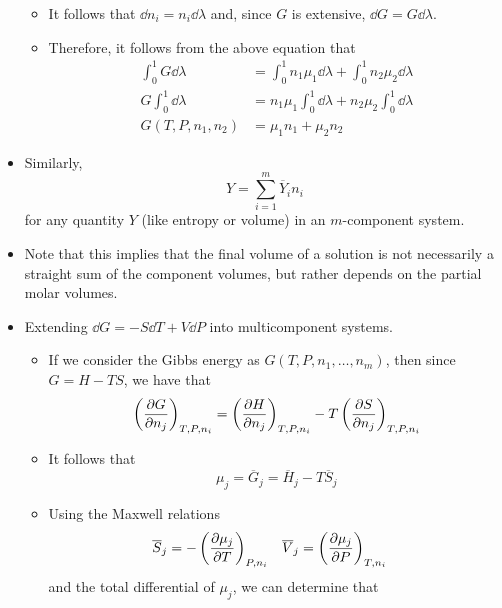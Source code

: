 \documentclass[../notes.tex]{subfiles}
\begin{document}
\begin{itemize}
\begin{itemize}
        \item It follows that $\dd{n_i}=n_i\dd{\lambda}$ and, since $G$ is extensive, $\dd{G}=G\dd{\lambda}$.
        \item Therefore, it follows from the above equation that
        \begin{align*}
            \int_0^1G\dd{\lambda} &= \int_0^1n_1\mu_1\dd{\lambda}+\int_0^1n_2\mu_2\dd{\lambda}\\
            G\int_0^1\dd{\lambda} &= n_1\mu_1\int_0^1\dd{\lambda}+n_2\mu_2\int_0^1\dd{\lambda}\\
            G(T,P,n_1,n_2) &= \mu_1n_1+\mu_2n_2
        \end{align*}
    \end{itemize}
    \item Similarly,
    \begin{equation*}
        Y = \sum_{i=1}^m\overline{Y}_in_i
    \end{equation*}
    for any quantity $Y$ (like entropy or volume) in an $m$-component system.
    \item Note that this implies that the final volume of a solution is not necessarily a straight sum of the component volumes, but rather depends on the partial molar volumes.
    \item Extending $\dd{G}=-S\dd{T}+V\dd{P}$ into multicomponent systems.
    \begin{itemize}
        \item If we consider the Gibbs energy as $G(T,P,n_1,\dots,n_m)$, then since $G=H-TS$, we have that
        \begin{equation*}
            \left( \pdv{G}{n_j} \right)_{T,P,n_i} = \left( \pdv{H}{n_j} \right)_{T,P,n_i}-T\left( \pdv{S}{n_j} \right)_{T,P,n_i}
        \end{equation*}
        \item It follows that
        \begin{equation*}
            \mu_j = \overline{G}_j = \overline{H}_j-T\overline{S}_j
        \end{equation*}
        \item Using the Maxwell relations
        \begin{align*}
            \overline{S}_j &= -\left( \pdv{\mu_j}{T} \right)_{P,n_i}&
            \overline{V}_j &= \left( \pdv{\mu_j}{P} \right)_{T,n_i}
        \end{align*}
        and the total differential of $\mu_j$, we can determine that
        \begin{equation*}

\end{equation*}
\end{itemize}
\end{itemize}
\end{document}
